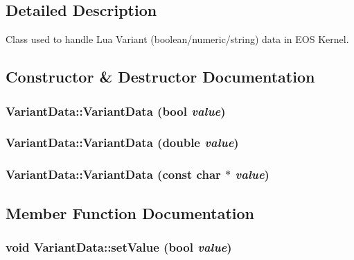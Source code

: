 \subsection{Detailed Description}
Class used to handle Lua Variant (boolean/numeric/string) data in EOS Kernel. 

\subsection{Constructor \& Destructor Documentation}
\hypertarget{classVariantData_90e5e3c8c2e17774418b3c5de03d24c4}{
\subsubsection[{VariantData}]{\setlength{\rightskip}{0pt plus 5cm}VariantData::VariantData (bool {\em value})}}
\label{classVariantData_90e5e3c8c2e17774418b3c5de03d24c4}


\hypertarget{classVariantData_1eccb0ef55abb0849460e289364fa8a1}{
\subsubsection[{VariantData}]{\setlength{\rightskip}{0pt plus 5cm}VariantData::VariantData (double {\em value})}}
\label{classVariantData_1eccb0ef55abb0849460e289364fa8a1}


\hypertarget{classVariantData_033f281690c41ecb8529d5ec4dcee50f}{
\subsubsection[{VariantData}]{\setlength{\rightskip}{0pt plus 5cm}VariantData::VariantData (const char $\ast$ {\em value})}}
\label{classVariantData_033f281690c41ecb8529d5ec4dcee50f}




\subsection{Member Function Documentation}
\hypertarget{classVariantData_d4ee952cc8ced49176df1d773dec64dd}{
\subsubsection[{setValue}]{\setlength{\rightskip}{0pt plus 5cm}void VariantData::setValue (bool {\em value})}}
\label{classVariantData_d4ee952cc8ced49176df1d773dec64dd}


